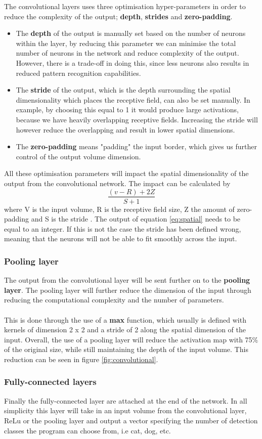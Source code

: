 The convolutional layers uses three optimisation hyper-parameters in order to reduce the complexity of the output; \textbf{depth}, \textbf{strides} and \textbf{zero-padding}.
\begin{itemize}
    \item The \textbf{depth} of the output is manually set based on the number of neurons within the layer, by reducing this parameter we can minimise the total number of neurons in the network and reduce complexity of the output. However, there is a trade-off in doing this, since less neurons also results in reduced pattern recognition capabilities.
    \item The \textbf{stride} of the output, which is the depth surrounding the spatial dimensionality which places the receptive field, can also be set manually. In example, by choosing this equal to 1 it would produce large activations, because we have heavily overlapping receptive fields. Increasing the stride will however reduce the overlapping and result in lower spatial dimensions.
    \item The \textbf{zero-padding} means "padding" the input border, which gives us further control of the output volume dimension.
\end{itemize}
All these optimisation parameters will impact the spatial dimensionality of the output from the convolutional network. The impact can be calculated by
\begin{equation}
    \frac{(v-R)+2Z}{S+1}
\label{eq:spatial}
\end{equation}
where V is the input volume, R is the receptive field size, Z the amount of zero-padding and S is the stride \cite{Keiron}. The output of equation \ref{eq:spatial} needs to be equal to an integer. If this is not the case the stride has been defined wrong, meaning that the neurons will not be able to fit smoothly across the input. 
\subsubsection{Pooling layer}
The output from the convolutional layer will be sent further on to the \textbf{pooling layer}. The pooling layer will further reduce the dimension of the input through reducing the computational complexity and the number of parameters.\\\\
This is done through the use of a \textbf{max} function, which usually is defined with kernels of dimension 2 x 2 and a stride of 2 along the spatial dimension of the input. Overall, the use of a pooling layer will reduce the activation map with 75$\percent$ of the original size, while still maintaining the depth of the input volume. This reduction can be seen in figure \ref{fig:convolutional}. 
\subsubsection{Fully-connected layers}
Finally the fully-connected layer are attached at the end of the network. In all simplicity this layer will take in an input volume from the convolutional layer, ReLu or the pooling layer and output a vector specifying the number of detection classes the program can choose from, i.e cat, dog, etc. 

